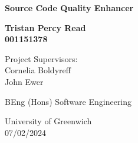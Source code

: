 



\begin{titlepage}
    \begin{center}
        \vspace*{1cm}
            
        \Huge
        \textbf{Source Code Quality Enhancer}
            
            
        \vspace{1.5cm}
            
        \textbf{Tristan Percy Read\\001151378}

        \vspace{0.8cm}
        Project Supervisors:\\
        Cornelia Boldyreff\\
        John Ewer
            
        \vfill
            
        BEng (Hons) Software Engineering
            
        \vspace{0.8cm}
            
        \Large
        University of Greenwich\\
        07/02/2024
    \end{center}
\end{titlepage}
